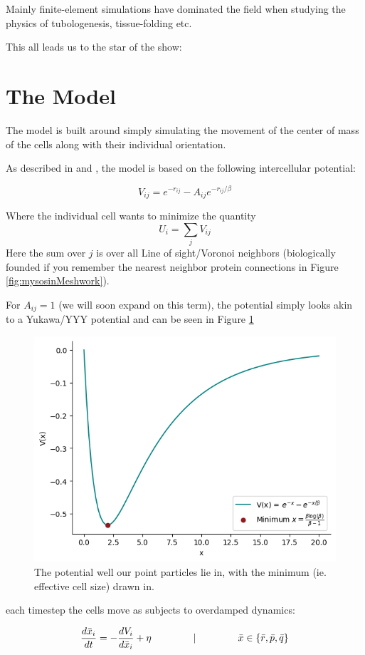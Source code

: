 Mainly finite-element simulations have dominated the field when studying the physics of tubologenesis, tissue-folding etc.  

This all leads us to the star of the show:

\section{The Model}
The model is built around simply simulating the movement of the center of mass of the cells along with their individual orientation. 

As described in \cite{} and \cite{}, the model is based on the following intercellular potential:

\begin{equation}
    V_{ij}=e^{-r_{ij}}-A_{ij}e^{-r_{ij}/\beta}
\end{equation}

Where the individual cell wants to minimize the quantity 
\begin{equation}
    U_i = \sum_j V_{ij}
\end{equation}
Here the sum over $j$ is over all Line of sight/Voronoi neighbors (biologically founded if you remember the nearest neighbor protein connections in Figure \ref{fig:mysosinMeshwork}). 


For $A_{ij}=1$ (we will soon expand on this term), the potential simply looks akin to a Yukawa/YYY potential and can be seen in Figure \ref{fig:potential} 
\begin{figure}[H]
    \centering
    \includegraphics[width=0.6\linewidth]{chapters/Theory/figures/potential.png}
    \caption{The potential well our point particles lie in, with the minimum (ie. effective cell size) drawn in.}
    \label{fig:potential}
\end{figure}
each timestep the cells move as subjects to overdamped dynamics:

\begin{equation}
    \frac{d \bar{x}_i}{d t}=-\frac{d V_i}{d \bar{x}_i}+\eta \hspace{1.5cm}|\hspace{1.5cm}  \bar{x} \in \{\bar{r}, \bar{p}, \bar{q}\}
\end{equation}

